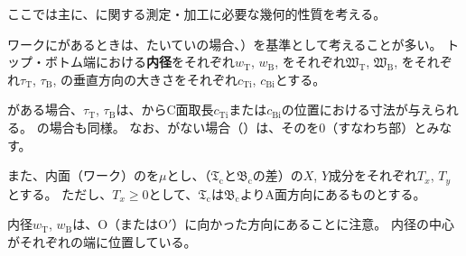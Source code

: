 

ここでは主に、\textbf{\Outcut}に関する測定・加工に必要な幾何的性質を考える。

ワークに\textbf{\Outcut}があるときは、たいていの場合、\textbf{\OutcutAsideThickness}）を基準として考えることが多い。
トップ・ボトム端における\textbf{内径}をそれぞれ$w_\mathrm T$, $w_\mathrm B$, \textbf{\OutcutWidth}をそれぞれ$\mathfrak W_\mathrm T$, $\mathfrak W_\mathrm B$, \OutcutAsideThickness をそれぞれ$\tau_\mathrm T$, $\tau_\mathrm B$, \EndFaceInCChamfer の垂直方向の大きさをそれぞれ$c_\mathrm{Ti}$, $c_\mathrm{Bi}$とする。
\begin{hosoku}
\EndFaceInCChamfer がある場合、\OutcutAsideThickness$\tau_\mathrm T$, $\tau_\mathrm B$は、\EndFace からC面取長$c_\mathrm{Ti}$または$c_\mathrm{Bi}$の位置における寸法が与えられる。
\EndFaceInRChamferRadius の場合も同様。
なお、\EndFaceChamfer がない場合（）は、その\EndFaceChamferLength を0（すなわち\EndFace 部）とみなす。
\end{hosoku}
また、内面（ワーク）の\textbf{\PlatingThk}を$\mu$とし、\CenterlineEndFaceDif（\TopOutcutCenter$\mathfrak T_\mathrm c$と\BottomOutcutCenter$\mathfrak B_\mathrm c$の差）の$X$, $Y$成分をそれぞれ$T_x$, $T_y$とする。
ただし、$T_x \geq 0$として、\TopOutcutCenter$\mathfrak T_\mathrm c$は\BottomOutcutCenter$\mathfrak B_\mathrm c$よりA面方向にあるものとする。
\begin{hosoku}
内径$w_\mathrm T$, $w_\mathrm B$は、\CurvatureCenter O（またはO$'$）に向かった方向にあることに注意。
内径の中心がそれぞれの端に位置している。
\end{hosoku}



